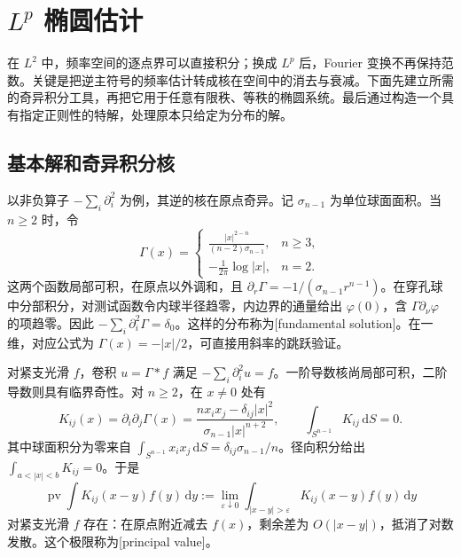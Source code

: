 
% 
% 

\section{\texorpdfstring{\(L^p\)}{Lᵖ} 椭圆估计}
\label{g3:sec:1204}

在 \(L^2\) 中，频率空间的逐点界可以直接积分；换成 \(L^p\) 后，Fourier 变换不再保持范数。关键是把逆主符号的频率估计转成核在空间中的消去与衰减。下面先建立所需的奇异积分工具，再把它用于任意有限秩、等秩的椭圆系统。最后通过构造一个具有指定正则性的特解，处理原本只给定为分布的解。

\subsection{基本解和奇异积分核}
\label{g3:subsec:1204:01}
以非负算子 \(-\sum_i\partial_i^2\) 为例，其逆的核在原点奇异。记 \(\sigma_{n-1}\) 为单位球面面积。当 \(n\ge2\) 时，令
\[
	\Gamma(x)=
	\begin{cases}
	\displaystyle\frac{|x|^{2-n}}{(n-2)\sigma_{n-1}},&n\ge3,\\[4pt]
	\displaystyle-\frac1{2\pi}\log|x|,&n=2.
	\end{cases}
\]
这两个函数局部可积，在原点以外调和，且 \(\partial_r\Gamma=-1/(\sigma_{n-1}r^{n-1})\)。在穿孔球中分部积分，对测试函数令内球半径趋零，内边界的通量给出 \(\varphi(0)\)，含 \(\Gamma\partial_\nu\varphi\) 的项趋零。因此 \(-\sum_i\partial_i^2\Gamma=\delta_0\)。这样的分布称为[fundamental solution]。在一维，对应公式为 \(\Gamma(x)=-|x|/2\)，可直接用斜率的跳跃验证。

\ProseParagraphBreak

对紧支光滑 \(f\)，卷积 \(u=\Gamma*f\) 满足 \(-\sum_i\partial_i^2u=f\)。一阶导数核尚局部可积，二阶导数则具有临界奇性。对 \(n\ge2\)，在 \(x\ne0\) 处有
\[
	K_{ij}(x)=\partial_i\partial_j\Gamma(x)
	=\frac{n x_ix_j-\delta_{ij}|x|^2}{\sigma_{n-1}|x|^{n+2}},
	\qquad \int_{S^{n-1}}K_{ij}\,\mathrm dS=0.
\]
其中球面积分为零来自 \(\int_{S^{n-1}}x_ix_j\,\mathrm dS=\delta_{ij}\sigma_{n-1}/n\)。径向积分给出 \(\int_{a<|x|<b}K_{ij}=0\)。于是
\[
	\operatorname{pv}\int K_{ij}(x-y)f(y)\,\mathrm dy
	:=\lim_{\varepsilon\downarrow0}\int_{|x-y|>\varepsilon}K_{ij}(x-y)f(y)\,\mathrm dy
\]
对紧支光滑 \(f\) 存在：在原点附近减去 \(f(x)\)，剩余差为 \(O(|x-y|)\)，抵消了对数发散。这个极限称为[principal value]。

